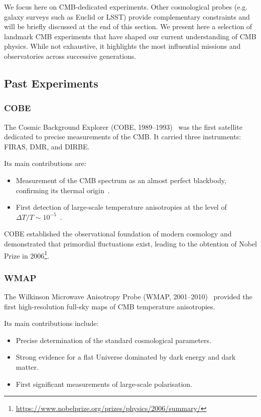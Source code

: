 \documentclass[../../thesis.tex]{subfiles}
\begin{document}
We focus here on CMB-dedicated experiments. Other cosmological probes (e.g. galaxy surveys such as Euclid or LSST) provide complementary constraints and will be briefly discussed at the end of this section. We present here a selection of landmark CMB experiments that have shaped our current understanding of CMB physics. While not exhaustive, it highlights the most influential missions and observatories across successive generations.

\subsection{Past Experiments}

\subsubsection{COBE}

The Cosmic Background Explorer (COBE, 1989–1993)~\cite{boggess1992} was the first satellite dedicated to precise measurements of the CMB. It carried three instruments: FIRAS, DMR, and DIRBE.

Its main contributions are:
\begin{itemize}
    \item Measurement of the CMB spectrum as an almost perfect blackbody, confirming its thermal origin~\cite{COBE1996}.
    \item First detection of large-scale temperature anisotropies at the level of $\Delta T/T \sim 10^{-5}$~\cite{COBE_DMR_1992}.
\end{itemize}

COBE established the observational foundation of modern cosmology and demonstrated that primordial fluctuations exist, leading to the obtention of Nobel Prize in 2006\footnote{\url{https://www.nobelprize.org/prizes/physics/2006/summary/}}.

\subsubsection{WMAP}

The Wilkinson Microwave Anisotropy Probe (WMAP, 2001–2010)~\cite{WMAP_9Years} provided the first high-resolution full-sky maps of CMB temperature anisotropies.

Its main contributions include:
\begin{itemize}
    \item Precise determination of the standard cosmological parameters.
    \item Strong evidence for a flat Universe dominated by dark energy and dark matter.
    \item First significant measurements of large-scale polarisation.
\end{itemize}
\end{document}
